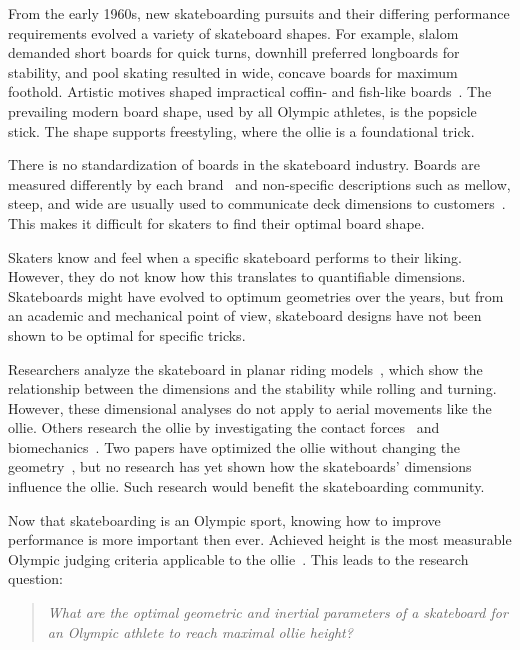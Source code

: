 \documentclass[default,iicol]{sn-jnl}
\begin{document}
From the early 1960s, new skateboarding pursuits and their differing performance requirements evolved a variety of skateboard shapes.
For example, slalom demanded short boards for quick turns, downhill preferred longboards for stability, and pool skating resulted in wide, concave boards for maximum foothold. 
Artistic motives shaped impractical coffin- and
fish-like boards~\cite{prentiss_get_2011}.
The prevailing modern board shape, used by all Olympic athletes, is the popsicle stick.
The shape supports freestyling, where the ollie is a foundational trick.

There is no standardization of boards in the skateboard industry.
Boards are measured differently by each brand~\cite{johnny_skateboarding_2013} and non-specific descriptions such as mellow, steep, and wide are usually used to communicate deck dimensions to customers~\cite{berger_handmade_2021}.
This makes it difficult for skaters to find their optimal board shape.

Skaters know and feel when a specific skateboard performs to their liking.
However, they do not know how this translates to quantifiable dimensions.
Skateboards might have evolved to optimum geometries over the years, but from an academic and mechanical point of view, skateboard designs have not been shown to be optimal for specific tricks.

Researchers analyze the skateboard in planar riding models~\cite{hubbard_lateral_1979,hubbard_human_1980,kremnev_nonlinear_2010,ispolov_skateboard_1996,rosatello_skateboard_2015,varszegi_stability_2017,varszegi_stabilizing_2016,varszegi_downhill_2016,varszegi_balancing_2014,kuleshov_mathematical_2007,kuleshov_various_2010}, which show the relationship between the dimensions and the stability while rolling and turning. 
However, these dimensional analyses do not apply to aerial movements like the ollie.
Others research the ollie by investigating the contact forces~\cite{anderson_ollie_2020,shield_contact-implicit_2022} and biomechanics~\cite{frederick_biomechanics_2006,vorlicek_analysis_2015,wood_3d_2020,nakashima_simulation_2021,nevitt_ground_2006,candotti_lower_2012,dias_using_2016,anderson_ollie_2020,bridgman_human_1992,ou_postural_2021}.
Two papers have optimized the ollie without changing the geometry~\cite{anderson_ollie_2020,shield_contact-implicit_2022}, but no research has yet shown how the skateboards' dimensions influence the ollie.
Such research would benefit the skateboarding community.

Now that skateboarding is an Olympic sport, knowing how to improve performance is more important then ever.
Achieved height is the most measurable Olympic judging criteria applicable to the ollie~\cite{world_skate_skateboarding_2021}.
This leads to the research question:
\begin{quote}
\textit{
    What are the optimal geometric and inertial parameters of a skateboard for an Olympic athlete to reach maximal ollie height?}
\end{quote}
\end{document}
